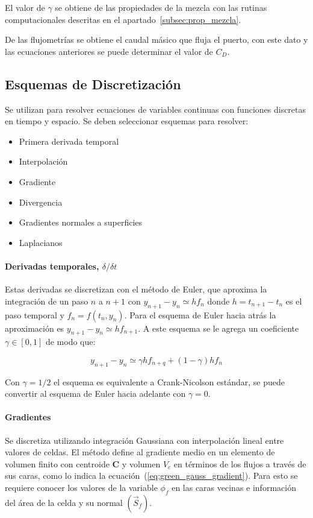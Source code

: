 El valor de $\gamma$ se obtiene de las propiedades de la mezcla con las rutinas
computacionales descritas en el apartado~\ref{subsec:prop_mezcla}.

De las flujometrías se obtiene el caudal másico que fluja el puerto, con este
dato y las ecuaciones anteriores se puede determinar el valor de $C_{D}$.

\subsection{Esquemas de Discretización}

Se utilizan para resolver ecuaciones de variables continuas con funciones
discretas en tiempo y espacio.
%
Se deben seleccionar esquemas para resolver:

\begin{itemize}
  \item Primera derivada temporal
  \item Interpolación
  \item Gradiente
  \item Divergencia
  \item Gradientes normales a superficies
  \item Laplacianos
\end{itemize}


\paragraph{Derivadas temporales, $\delta / \delta t$}
%
Estas derivadas se discretizan con el método de Euler\parencite{burden}, que
aproxima la integración de un paso $n$ a $n+1$ con $y_{n+1}-y_{n}\simeq hf_{n}$
donde $h = t_{n+1}-t_{n}$ es el paso temporal y $f_{n}=f(t_{n},y_{n})$.
%
Para el esquema de Euler hacia atrás la aproximación es
$y_{n+1}-y_{n}\simeq h f_{n+1}$.
%
A este esquema se le agrega un coeficiente $\gamma\in[0,1]$ de modo que:

\begin{equation}
  y_{n+1}-y_{n} \simeq \gamma h f_{n+q} + (1-\gamma)h f_{n}
\end{equation}

Con $\gamma=1/2$ el esquema es equivalente a Crank-Nicolson estándar, se puede
convertir al esquema de Euler hacia adelante con $\gamma=0$.

\paragraph{Gradientes}
%
Se discretiza utilizando integración Gaussiana con interpolación lineal entre
valores de celdas.
%
El método define al gradiente medio en un elemento de volumen finito con
centroide \textbf{C} y volumen $V_{c}$ en términos de los flujos a través de sus
caras, como lo indica la ecuación~(\ref{eq:green_gauss_gradient}).
%
Para esto se requiere conocer los valores de la variable $\phi_{f}$ en las caras
vecinas e información del área de la celda y su normal $(\vec{S}_{f})$.

